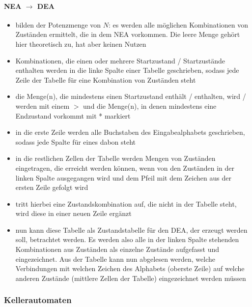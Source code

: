 \documentclass{article}
\begin{document}
	\paragraph{NEA $\rightarrow$ DEA}
	\begin{itemize}
		\item bilden der Potenzmenge von $N$: es werden alle möglichen Kombinationen von Zuständen ermittelt, die in dem NEA vorkommen. Die leere Menge gehört hier theoretisch zu, hat aber keinen Nutzen
		\item Kombinationen, die einen oder mehrere Startzustand / Startzustände enthalten werden in die linke Spalte einer Tabelle geschrieben, sodass jede Zeile der Tabelle für eine Kombination von Zuständen steht
		\item die Menge(n), die mindestens einen Startzustand enthält / enthalten, wird / werden mit einem $>$ und die Menge(n), in denen mindestens eine Endzustand vorkommt mit * markiert
		\item in die erste Zeile werden alle Buchstaben des Eingabealphabets geschrieben, sodass jede Spalte für eines dabon steht
		\item in die restlichen Zellen der Tabelle werden Mengen von Zuständen eingetragen, die erreicht werden können, wenn von den Zuständen in der linken Spalte ausgegangen wird und dem Pfeil mit dem Zeichen aus der ersten Zeile gefolgt wird
		\item tritt hierbei eine Zustandskombination auf, die nicht in der Tabelle steht, wird diese in einer neuen Zeile ergänzt
		\item nun kann diese Tabelle als Zustandstabelle für den DEA, der erzeugt werden soll, betrachtet werden. Es werden also alle in der linken Spalte stehenden Kombinationen aus Zuständen als einzelne Zustände aufgefasst und eingezeichnet. Aus der Tabelle kann nun abgelesen werden, welche Verbindungen mit welchen Zeichen des Alphabets (oberste Zeile) auf welche anderen Zustände (mittlere Zellen der Tabelle) eingezeichnet werden müssen
	\end{itemize}
	
	\subsubsection{Kellerautomaten}
	
\end{document}
